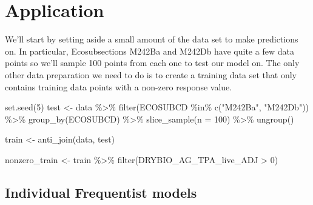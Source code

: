 \documentclass[12pt,twoside]{reedthesis}
\newenvironment{Shaded}{\begin{snugshade}}{\end{snugshade}}
\newcommand{\AttributeTok}[1]{\textcolor[rgb]{0.77,0.63,0.00}{#1}}
\newcommand{\DecValTok}[1]{\textcolor[rgb]{0.00,0.00,0.81}{#1}}
\newcommand{\FunctionTok}[1]{\textcolor[rgb]{0.00,0.00,0.00}{#1}}
\newcommand{\NormalTok}[1]{#1}
\newcommand{\OtherTok}[1]{\textcolor[rgb]{0.56,0.35,0.01}{#1}}
\newcommand{\SpecialCharTok}[1]{\textcolor[rgb]{0.00,0.00,0.00}{#1}}
\newcommand{\StringTok}[1]{\textcolor[rgb]{0.31,0.60,0.02}{#1}}
\begin{document}
\hypertarget{application}{%
\section{Application}\label{application}}

We'll start by setting aside a small amount of the data set to make predictions on. In particular, Ecosubsections M242Ba and M242Db have quite a few data points so we'll sample 100 points from each one to test our model on. The only other data preparation we need to do is to create a training data set that only contains training data points with a non-zero response value.
\begin{Shaded}
\begin{Highlighting}[]
\FunctionTok{set.seed}\NormalTok{(}\DecValTok{5}\NormalTok{)}
\NormalTok{test }\OtherTok{\textless{}{-}}\NormalTok{ data }\SpecialCharTok{\%\textgreater{}\%} 
  \FunctionTok{filter}\NormalTok{(ECOSUBCD }\SpecialCharTok{\%in\%} \FunctionTok{c}\NormalTok{(}\StringTok{"M242Ba"}\NormalTok{, }\StringTok{"M242Db"}\NormalTok{)) }\SpecialCharTok{\%\textgreater{}\%} 
  \FunctionTok{group\_by}\NormalTok{(ECOSUBCD) }\SpecialCharTok{\%\textgreater{}\%} 
  \FunctionTok{slice\_sample}\NormalTok{(}\AttributeTok{n =} \DecValTok{100}\NormalTok{) }\SpecialCharTok{\%\textgreater{}\%} 
  \FunctionTok{ungroup}\NormalTok{()}

\NormalTok{train }\OtherTok{\textless{}{-}} \FunctionTok{anti\_join}\NormalTok{(data, test)}

\NormalTok{nonzero\_train }\OtherTok{\textless{}{-}}\NormalTok{ train }\SpecialCharTok{\%\textgreater{}\%} 
  \FunctionTok{filter}\NormalTok{(DRYBIO\_AG\_TPA\_live\_ADJ }\SpecialCharTok{\textgreater{}} \DecValTok{0}\NormalTok{)}
\end{Highlighting}
\end{Shaded}
\hypertarget{individual-frequentist-models}{%
\subsection{Individual Frequentist models}\label{individual-frequentist-models}}
\end{document}
